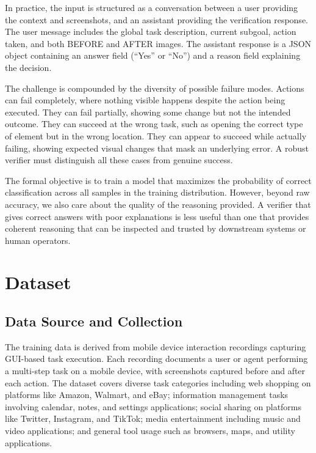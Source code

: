 \documentclass[11pt,a4paper]{article}
\begin{document}
In practice, the input is structured as a conversation between a user providing the context and screenshots, and an assistant providing the verification response. The user message includes the global task description, current subgoal, action taken, and both BEFORE and AFTER images. The assistant response is a JSON object containing an answer field (``Yes'' or ``No'') and a reason field explaining the decision.

The challenge is compounded by the diversity of possible failure modes. Actions can fail completely, where nothing visible happens despite the action being executed. They can fail partially, showing some change but not the intended outcome. They can succeed at the wrong task, such as opening the correct type of element but in the wrong location. They can appear to succeed while actually failing, showing expected visual changes that mask an underlying error. A robust verifier must distinguish all these cases from genuine success.

The formal objective is to train a model that maximizes the probability of correct classification across all samples in the training distribution. However, beyond raw accuracy, we also care about the quality of the reasoning provided. A verifier that gives correct answers with poor explanations is less useful than one that provides coherent reasoning that can be inspected and trusted by downstream systems or human operators.


\section{Dataset}

\subsection{Data Source and Collection}

The training data is derived from mobile device interaction recordings capturing GUI-based task execution. Each recording documents a user or agent performing a multi-step task on a mobile device, with screenshots captured before and after each action. The dataset covers diverse task categories including web shopping on platforms like Amazon, Walmart, and eBay; information management tasks involving calendar, notes, and settings applications; social sharing on platforms like Twitter, Instagram, and TikTok; media entertainment including music and video applications; and general tool usage such as browsers, maps, and utility applications.
\end{document}
